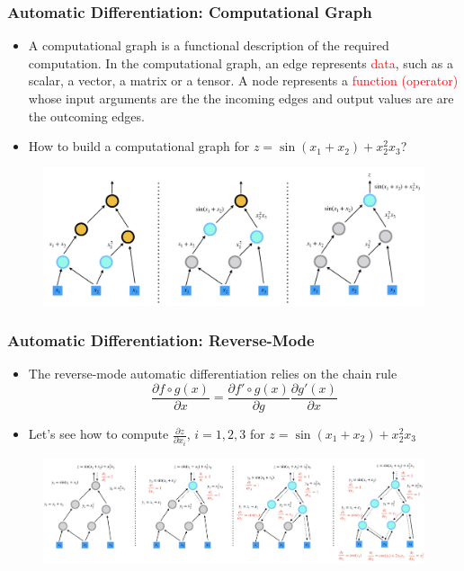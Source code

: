 \documentclass{beamer}
\begin{document}
\begin{frame}
	\frametitle{Automatic Differentiation: Computational Graph}
	
	\begin{itemize}
		\item A computational graph is a functional description of the required computation. In the computational graph, an edge represents \textcolor{red}{data}, such as a scalar, a vector, a matrix or a tensor. A node represents a \textcolor{red}{function (operator)} whose input arguments are the the incoming edges and output values are are the outcoming edges. 
		\item How to build a computational graph for $z = \sin(x_1+x_2) + x_2^2 x_3$?
	\end{itemize}
	
	\begin{figure}[hbt]
  \includegraphics[width=1.0\textwidth]{../fd}
\end{figure}
\end{frame}

\begin{frame}
	\frametitle{Automatic Differentiation: Reverse-Mode}
	
	\begin{itemize}
		\item The reverse-mode automatic differentiation relies on the chain rule 
		$$\frac{\partial f\circ g (x)}{\partial x} = \frac{\partial f'\circ g(x)}{\partial g} \frac{\partial g'(x)}{\partial x}$$
		\item Let's see how to compute $\frac{\partial z}{\partial x_i}$, $i=1,2,3$ for $z = \sin(x_1+x_2) + x_2^2 x_3$
	\end{itemize}
	\centering
	\begin{figure}[hbt]
  \includegraphics[width=1.0\textwidth]{../bd}
\end{figure}

\end{frame}
\end{document}
